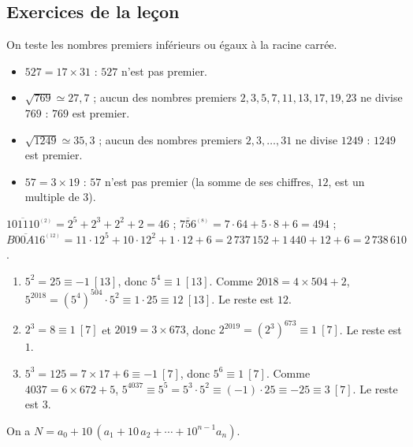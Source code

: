 \begin{corrige}
\subsection*{Exercices de la le\c{c}on}
%
\begin{sol}
On teste les nombres premiers inf\'erieurs ou \'egaux \`a la racine carr\'ee.
\begin{itemize}
\item $527 = 17 \times 31$ : $527$ n'est pas premier.
\item $\sqrt{769} \simeq 27{,}7$ ; aucun des nombres premiers $2, 3, 5, 7, 11, 13, 17, 19, 23$ ne divise $769$ : $769$ est premier.
\item $\sqrt{1249} \simeq 35{,}3$ ; aucun des nombres premiers $2, 3, \ldots, 31$ ne divise $1249$ : $1249$ est premier.
\item $57 = 3 \times 19$ : $57$ n'est pas premier (la somme de ses chiffres, $12$, est un multiple de $3$).
\end{itemize}
\end{sol}
%
\begin{sol}
$\overline{101110}^{_{(2)}} = 2^5 + 2^3 + 2^2 + 2 = 46$ ;
$\overline{756}^{_{(8)}} = 7 \cdot 64 + 5 \cdot 8 + 6 = 494$ ;
$\overline{B00A16}^{_{(12)}} = 11 \cdot 12^5 + 10 \cdot 12^2 + 1 \cdot 12 + 6 = 2\,737\,152 + 1\,440 + 12 + 6 = 2\,738\,610$.
\end{sol}
%
\begin{sol}
\begin{enumerate}
\item $5^2 = 25 \equiv -1 \ [13]$, donc $5^4 \equiv 1 \ [13]$. Comme $2018 = 4 \times 504 + 2$,
      $5^{2018} = (5^4)^{504} \cdot 5^2 \equiv 1 \cdot 25 \equiv 12 \ [13]$. Le reste est $\boxed{12}$.
\item $2^3 = 8 \equiv 1 \ [7]$ et $2019 = 3 \times 673$, donc $2^{2019} = (2^3)^{673} \equiv 1 \ [7]$. Le reste est $\boxed{1}$.
\item $5^3 = 125 = 7 \times 17 + 6 \equiv -1 \ [7]$, donc $5^6 \equiv 1 \ [7]$.
      Comme $4037 = 6 \times 672 + 5$, $5^{4037} \equiv 5^5 = 5^3 \cdot 5^2 \equiv (-1) \cdot 25 \equiv -25 \equiv 3 \ [7]$.
      Le reste est $\boxed{3}$.
\end{enumerate}
\end{sol}
%
\begin{sol}
On a $N = a_0 + 10\,(a_1 + 10\, a_2 + \cdots + 10^{n-1} a_n)$.
\begin{enumerate}

\end{enumerate}
\end{sol}
\end{corrige}
